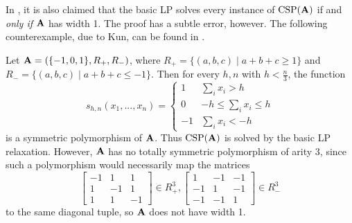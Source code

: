 \documentclass[letterpaper,11pt]{article}
\DeclareMathOperator{\CSP}{CSP}
\begin{document}
\begin{rem} In \cite{lp-width-1}, it is also claimed that the basic LP solves every instance of $\CSP(\fA)$ if and \emph{only if} $\mathbf{A}$ has width 1. The proof has a subtle error, however. The following counterexample, due to Kun, can be found in \cite{dalmau-approximation}.
\end{rem}

\begin{ex} Let $\mathbf{A} = (\{-1,0,1\}, R_+, R_-)$, where $R_+ = \{(a,b,c) \mid a+b+c \ge 1\}$ and $R_- = \{(a,b,c) \mid a+b+c \le -1\}$. Then for every $h,n$ with $h < \frac{n}{3}$, the function
\[
s_{h,n}(x_1, ..., x_n) = \begin{cases}1 & \sum_i x_i > h\\ 0 & -h \le \sum_i x_i \le h\\ -1 & \sum_i x_i < -h\end{cases}
\]
is a symmetric polymorphism of $\mathbf{A}$. Thus $\CSP(\fA)$ is solved by the basic LP relaxation. However, $\mathbf{A}$ has no totally symmetric polymorphism of arity $3$, since such a polymorphism would necessarily map the matrices
\[
\begin{bmatrix} -1 & 1 & 1\\ 1 & -1 & 1\\ 1 & 1 & -1\end{bmatrix} \in R_+^3, \begin{bmatrix} 1 & -1 & -1\\ -1 & 1 & -1\\ -1 & -1 & 1\end{bmatrix} \in R_-^3
\]
to the same diagonal tuple, so $\mathbf{A}$ does not have width 1.
\end{ex}
\end{document}
